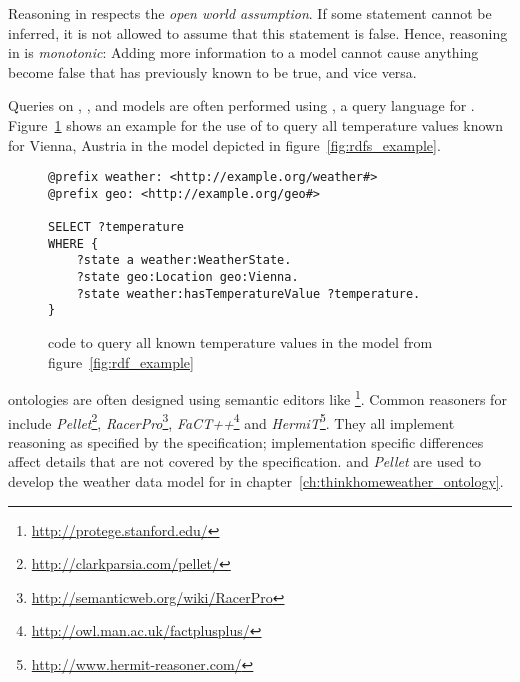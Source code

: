 \begin{itemize}
\end{itemize}

Reasoning in  respects the \emph{open world assumption}. If some statement cannot be inferred, it is not allowed to assume that this statement is false. Hence, reasoning in  is \emph{monotonic}: Adding more information to a model cannot cause anything become false that has previously known to be true, and vice versa.


Queries on , , and  models are often performed using , a query language for . Figure~\ref{fig:sparql_example} shows an example for the use of  to query all temperature values known for Vienna, Austria in the  model depicted in figure~\ref{fig:rdfs_example}.

\begin{figure}
\begin{lstlisting}
@prefix weather: <http://example.org/weather#>
@prefix geo: <http://example.org/geo#>

SELECT ?temperature
WHERE {
    ?state a weather:WeatherState.
    ?state geo:Location geo:Vienna.
    ?state weather:hasTemperatureValue ?temperature.
}
\end{lstlisting}
\caption{ code to query all known temperature values in the model from figure~\ref{fig:rdf_example}}
\label{fig:sparql_example}
\end{figure}

 ontologies are often designed using semantic editors like \protege\footnote{\href{http://protege.stanford.edu/}{http://protege.stanford.edu/}}. Common reasoners for  include \emph{Pellet}\footnote{\href{http://clarkparsia.com/pellet/}{http://clarkparsia.com/pellet/}}, \emph{RacerPro}\footnote{\href{http://semanticweb.org/wiki/RacerPro}{http://semanticweb.org/wiki/RacerPro}}, \emph{FaCT++}\footnote{\href{http://owl.man.ac.uk/factplusplus/}{http://owl.man.ac.uk/factplusplus/}} and \emph{HermiT}\footnote{\href{http://www.hermit-reasoner.com/}{http://www.hermit-reasoner.com/}}. They all implement reasoning as specified by the  specification; implementation specific differences affect details that are not covered by the  specification. \protege and \emph{Pellet} are used to develop the weather data model for \thinkhome in chapter~\ref{ch:thinkhomeweather_ontology}.

